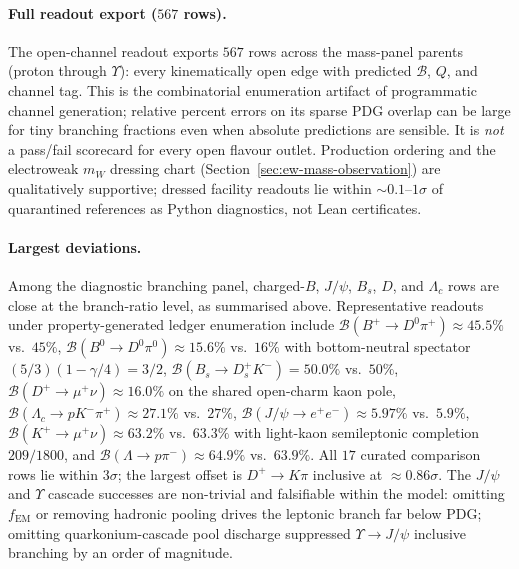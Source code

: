 \documentclass[11pt]{amsart}
\begin{document}








\paragraph{Full readout export ($567$ rows).}
The open-channel readout exports $567$ rows across the mass-panel parents
(proton through $\Upsilon$): every kinematically open edge with predicted
$\mathcal{B}$, $Q$, and channel tag.
This is the combinatorial enumeration artifact of programmatic channel generation;
relative percent errors on its sparse PDG overlap can be large for tiny branching
fractions even when absolute predictions are sensible.
It is \emph{not} a pass/fail scorecard for every open flavour outlet.
Production ordering and the electroweak $m_W$ dressing chart
(Section~\ref{sec:ew-mass-observation}) are qualitatively supportive; dressed
facility readouts lie within $\sim 0.1$--$1\sigma$ of quarantined references
as Python diagnostics, not Lean certificates.







\paragraph{Largest deviations.}
Among the diagnostic branching panel, charged-$B$, $J/\psi$, $B_s$, $D$, and
$\Lambda_c$ rows are close at the branch-ratio level, as summarised above.
Representative readouts under property-generated ledger enumeration include
$\mathcal{B}(B^+\to D^0\pi^+)\approx 45.5\%$ vs.\ $45\%$,
$\mathcal{B}(B^0\to D^0\pi^0)\approx 15.6\%$ vs.\ $16\%$ with bottom-neutral
spectator $(5/3)(1-\gamma/4)=3/2$,
$\mathcal{B}(B_s\to D_s^+K^-)=50.0\%$ vs.\ $50\%$,
$\mathcal{B}(D^+\to\mu^+\nu)\approx 16.0\%$ on the shared open-charm kaon pole,
$\mathcal{B}(\Lambda_c\to pK^-\pi^+)\approx 27.1\%$ vs.\ $27\%$,
$\mathcal{B}(J/\psi\to e^+e^-)\approx 5.97\%$ vs.\ $5.9\%$,
$\mathcal{B}(K^+\to\mu^+\nu)\approx 63.2\%$ vs.\ $63.3\%$ with light-kaon
semileptonic completion $209/1800$, and
$\mathcal{B}(\Lambda\to p\pi^-)\approx 64.9\%$ vs.\ $63.9\%$.
All $17$ curated comparison rows lie within $3\sigma$; the largest offset is
$D^+\to K\pi$ inclusive at $\approx 0.86\sigma$.
The $J/\psi$ and $\Upsilon$ cascade successes are non-trivial and falsifiable
within the model: omitting $f_{\mathrm{EM}}$ or removing hadronic pooling drives
the leptonic branch far below PDG; omitting quarkonium-cascade pool discharge
suppressed $\Upsilon\to J/\psi$ inclusive branching by an order of magnitude.
\end{document}
